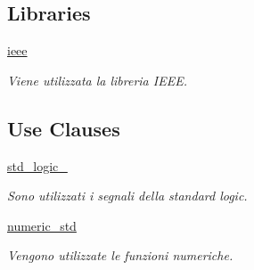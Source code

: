 \subsection*{Libraries}
 \begin{DoxyCompactItemize}
\item 
\mbox{\label{classUART__v1__0_a0a6af6eef40212dbaf130d57ce711256}} 
\hyperlink{classUART__v1__0_a0a6af6eef40212dbaf130d57ce711256}{ieee} 
\begin{DoxyCompactList}\small\item\em Viene utilizzata la libreria I\+E\+EE. \end{DoxyCompactList}\end{DoxyCompactItemize}
\subsection*{Use Clauses}
 \begin{DoxyCompactItemize}
\item 
\mbox{\label{classUART__v1__0_acd03516902501cd1c7296a98e22c6fcb}} 
\hyperlink{classUART__v1__0_acd03516902501cd1c7296a98e22c6fcb}{std\+\_\+logic\+\_}   
\begin{DoxyCompactList}\small\item\em Sono utilizzati i segnali della standard logic. \end{DoxyCompactList}\item 
\mbox{\label{classUART__v1__0_a2edc34402b573437d5f25fa90ba4013e}} 
\hyperlink{classUART__v1__0_a2edc34402b573437d5f25fa90ba4013e}{numeric\+\_\+std}   
\begin{DoxyCompactList}\small\item\em Vengono utilizzate le funzioni numeriche. \end{DoxyCompactList}\end{DoxyCompactItemize}
